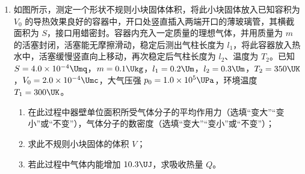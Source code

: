 \documentclass[\gkver]{gaokaozhenti}
\begin{document}
\begin{enumerate}
{Ⅱ．（1）指针未偏转，说明可能电阻过大，应换用“$\times$1 k”挡继续实验；根据“红进黑出”原则及二极管单向导电性可知红色表笔相连的是二极管负极。

（2）实现电压可从零开始调节，滑动变阻器采用分压式接法，P 应连接 a；根据图 C 可知电压表选取 $0\sim3\UV$ 量程，故 Q 接 d；
多用电表量程为 $50\UmA$，分度值为 $1\UmA$，需要估读到 $0.1\UmA$，故电表的读数为 $45.0\UmA$。

（3）根据图像可知 $I$ 随 $U$ 非线性变化，故说明该二极管是非线性元件，根据图像可知正常发光时即有电流通过时电压在 $1.9\UV\sim2.5\UV$ 范围。

Ⅲ．③要求 P$_{1}$ 和 P$_{2}$ 在一条光线上，该光线透过玻璃砖后过 P$_{3}$，故 P$_{3}$ 要能挡住 P$_{1}$ 和 P$_{2}$ 的虚像；

④cd 与 ab 垂直，则过 P$_{1}$ 和 P$_{2}$ 的光线与 ab 垂直，光垂直入射时传播方向不变，可确定 ef 边上的入射点，此时只需要找到折射光线上的一点即可确定出射光线，不需要插第四枚大头针；

⑤根据几何关系可知入射角为 $\theta$，折射角为 $\frac{\pi}{2} - \alpha$，故
$n = \frac{\sin\left(\frac{\pi}{2} - \alpha\right)}{\sin\theta} = \frac{\cos\alpha}{\sin\theta}$
}

\item
如图所示，测定一个形状不规则小块固体体积，将此小块固体放入已知容积为 $V_{0}$ 的导热效果良好的容器中，开口处竖直插入两端开口的薄玻璃管，其横截面积为 $S$，接口用蜡密封。容器内充入一定质量的理想气体，并用质量为 $m$ 的活塞封闭，活塞能无摩擦滑动，稳定后测出气柱长度为 $l_{1}$，将此容器放入热水中，活塞缓慢竖直向上移动，再次稳定后气柱长度为 $l_{2}$、温度为 $T_{2}$。已知 $S = 4.0\times10^{-4}\Umq$，$m = 0.1\Ukg$，$l_{1} = 0.2\Um$，$l_{2} = 0.3\Um$，$T_{2} = 350\UK$，$V_{0} = 2.0\times10^{-4}\Umc$，大气压强 $p_{0} = 1.0\times10^{5}\UPa$，环境温度 $T_{1} = 300\UK$。

\begin{enumerate}
	\item
	在此过程中器壁单位面积所受气体分子的平均作用力（选填“变大”“变小”或“不变”），气体分子的数密度（选填“变大”“变小”或“不变”）；
	\item
	求此不规则小块固体的体积 $V$；
	\item
	若此过程中气体内能增加 $10.3\UJ$，求吸收热量 $Q$。
\end{enumerate}
\end{enumerate}
\end{document}
